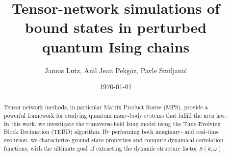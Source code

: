 \documentclass[reprint,amsmath,amssymb,aps,prb]{revtex4-2}
\begin{document}
\title{Tensor-network simulations of bound
states in perturbed quantum
Ising chains}
\author{Jannis Lutz, Anil Jean Pekgöz, Pavle Smiljanić}
\date{\today}
\begin{abstract}
Tensor network methods, in particular Matrix Product States (MPS), 
provide a powerful framework for studying quantum many-body systems that fulfill the area law. 
In this work, we investigate the transverse-field Ising model using the Time-Evolving Block Decimation (TEBD) algorithm. 
By performing both imaginary- and real-time evolution, we characterize ground-state properties and compute dynamical correlation functions, 
with the ultimate goal of extracting the dynamic structure factor $S(k, \omega)$.
\end{abstract}

\maketitle







\end{document}
